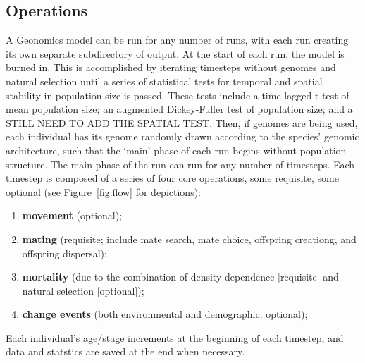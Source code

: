 ﻿\documentclass{article}
\begin{document}
\subsection{Operations}
A Geonomics model can be run for any number of runs,
with each run creating its own separate subdirectory of output.
At the start of each run, the model is burned in.
This is accomplished by iterating timesteps without genomes and
natural selection until a series of statistical tests for temporal
and spatial stability in population size is passed.
These tests include a time-lagged t-test of mean population size;
an augmented Dickey-Fuller test of population size;
and a {\large STILL NEED TO ADD THE SPATIAL TEST}.
Then, if genomes are being used, each individual has its genome randomly drawn
according to the species' genomic architecture, such that the `main' phase
of each run begins without population structure.
The main phase of the run can run for any number of timesteps. 
Each timestep is composed of a series of four core operations,
some requisite, some optional (see Figure~\ref{fig:flow} for depictions):
\begin{enumerate}
  \item \textbf{movement} (optional);
  \item \textbf{mating} (requisite; include mate search, mate choice, offspring creationg, and offspring dispersal);
  \item \textbf{mortality} (due to the combination of density-dependence [requisite] and natural selection [optional]);
  \item \textbf{change events} (both environmental and demographic; optional);
\end{enumerate}

Each individual's age/stage increments at the beginning of each timestep, and data and statstics are saved at the end when necessary.
\end{document}
